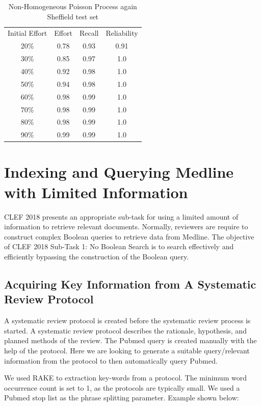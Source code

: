 \begin{table}[H]

\centering
\begin{tabular}{|c|c|c|c|} 
\hline
 Initial Effort & Effort & Recall & Reliability  \\ 
 20\% & 0.78 &		0.93 & 0.91 \\ 
 30\% & 0.85 &		0.97 & 1.0 \\ 
 40\% & 0.92 &		0.98 & 1.0 \\ 
 50\% & 0.94 &		0.98 & 1.0 \\ 
 60\% & 0.98 &		0.99 & 1.0 \\ 
 70\% & 0.98 &		0.99 & 1.0 \\ 
 80\% & 0.98 &		0.99 & 1.0 \\ 
 90\% & 0.99 &		0.99 & 1.0 \\  

  
 \hline
\end{tabular}

\caption{Non-Homogeneous Poisson Process again Sheffield test set}

\end{table}

\section{Indexing and Querying Medline with Limited Information}

CLEF 2018 \cite{CLEFLINK} presents an appropriate sub-task for using a limited amount of information to retrieve relevant documents. Normally, reviewers are require to construct complex Boolean queries to retrieve data from Medline. The objective of CLEF 2018 Sub-Task 1: No Boolean Search \cite{CLEFLINK} is to search effectively and efficiently bypassing the construction of the Boolean query.

\subsection{Acquiring Key Information from A Systematic Review Protocol}

A systematic review protocol is created before the systematic review process is started. A systematic review protocol describes the rationale, hypothesis, and planned methods of the review. The Pubmed query is created manually with the help of the protocol. Here we are looking to generate a suitable query/relevant information from the protocol to then automatically query Pubmed.

We used RAKE \cite{rake} to extraction key-words from a protocol. The minimum word occurrence count is set to 1, as the protocols are typically small. We used a Pubmed stop list as the phrase splitting parameter. Example shown below:

